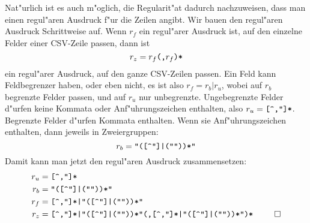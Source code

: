 \begin{loesung}
Nat"urlich ist es auch m"oglich, die Regularit"at dadurch nachzuweisen,
dass man einen regul"aren Ausdruck f"ur die Zeilen angibt. Wir bauen
den regul"aren Ausdruck Schrittweise auf. Wenn $r_f$ ein regul"arer Ausdruck
ist, auf den einzelne Felder einer CSV-Zeile passen, dann ist
\[
r_z=r_f\text{\tt (,}r_f\text{\tt )*}
\]
ein regul"arer Ausdruck, auf den ganze CSV-Zeilen passen. Ein Feld kann
Feldbegrenzer haben, oder eben nicht, es ist also $r_f=r_b|r_u$, wobei
auf $r_b$ begrenzte Felder passen, und auf $r_u$ nur unbegrenzte.
Ungebegrenzte Felder d"urfen keine Kommata oder Anf"uhrungszeichen
enthalten, also $r_u=\text{\tt [\char94,\char34]*}$. Begrenzte Felder
d"urfen Kommata enthalten. Wenn sie Anf"uhrungszeichen enthalten,
dann jeweils in Zweiergruppen:
\[
r_b=\text{\tt
\char34([\char94\char34]|(\char34\char34))*\char34
}
\]
Damit kann man jetzt den regul"aren Ausdruck zusammensetzen:
\begin{align*}
r_u&=\text{\tt
[\char94,\char34]*
}\\
r_b&=\text{\tt
\char34([\char94\char34]|(\char34\char34))*\char34
}\\
r_f&=\text{\tt
[\char94,\char34]*|\char34([\char94\char34]|(\char34\char34))*\char34
}\\
r_z&=\text{\tt
[\char94,\char34]*|\char34([\char94\char34]|(\char34\char34))*\char34
(,%
[\char94,\char34]*|\char34([\char94\char34]|(\char34\char34))*\char34
)*
}
\qedhere
\end{align*}
\end{loesung}
